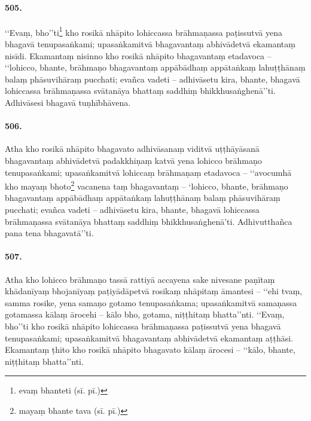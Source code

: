 \paragraph{505.} ‘‘Evaṃ, bho’’ti\footnote{evaṃ bhanteti (sī. pī.)} kho rosikā nhāpito lohiccassa brāhmaṇassa paṭissutvā yena bhagavā tenupasaṅkami; upasaṅkamitvā bhagavantaṃ abhivādetvā ekamantaṃ nisīdi. Ekamantaṃ nisinno kho rosikā nhāpito bhagavantaṃ etadavoca – ‘‘lohicco, bhante, brāhmaṇo bhagavantaṃ appābādhaṃ appātaṅkaṃ lahuṭṭhānaṃ balaṃ phāsuvihāraṃ pucchati; evañca vadeti – adhivāsetu kira, bhante, bhagavā lohiccassa brāhmaṇassa svātanāya bhattaṃ saddhiṃ bhikkhusaṅghenā’’ti. Adhivāsesi bhagavā tuṇhībhāvena.

\paragraph{506.} Atha kho rosikā nhāpito bhagavato adhivāsanaṃ viditvā uṭṭhāyāsanā bhagavantaṃ abhivādetvā padakkhiṇaṃ katvā yena lohicco brāhmaṇo tenupasaṅkami; upasaṅkamitvā lohiccaṃ brāhmaṇaṃ etadavoca – ‘‘avocumhā kho mayaṃ bhoto\footnote{mayaṃ bhante tava (sī. pī.)} vacanena taṃ bhagavantaṃ – ‘lohicco, bhante, brāhmaṇo bhagavantaṃ appābādhaṃ appātaṅkaṃ lahuṭṭhānaṃ balaṃ phāsuvihāraṃ pucchati; evañca vadeti – adhivāsetu kira, bhante, bhagavā lohiccassa brāhmaṇassa svātanāya bhattaṃ saddhiṃ bhikkhusaṅghenā’ti. Adhivutthañca pana tena bhagavatā’’ti.

\paragraph{507.} Atha kho lohicco brāhmaṇo tassā rattiyā accayena sake nivesane paṇītaṃ khādanīyaṃ bhojanīyaṃ paṭiyādāpetvā rosikaṃ nhāpitaṃ āmantesi – ‘‘ehi tvaṃ, samma rosike, yena samaṇo gotamo tenupasaṅkama; upasaṅkamitvā samaṇassa gotamassa kālaṃ ārocehi – kālo bho, gotama, niṭṭhitaṃ bhatta’’nti. ‘‘Evaṃ, bho’’ti kho rosikā nhāpito lohiccassa brāhmaṇassa paṭissutvā yena bhagavā tenupasaṅkami; upasaṅkamitvā bhagavantaṃ abhivādetvā ekamantaṃ aṭṭhāsi. Ekamantaṃ ṭhito kho rosikā nhāpito bhagavato kālaṃ ārocesi – ‘‘kālo, bhante, niṭṭhitaṃ bhatta’’nti.

